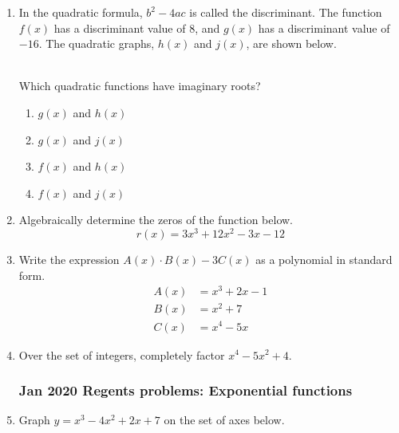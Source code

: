 \documentclass[12pt, twoside]{article}
\begin{document}
\begin{enumerate}[itemsep=0.5cm]
\item In the quadratic formula, $b^2-4ac$ is called the discriminant. The function $f(x)$ has a discriminant value of 8, and $g(x)$ has a discriminant value of $-16$. The quadratic graphs, $h(x)$ and $j(x)$, are shown below. \\
 \;
 \\
Which quadratic functions have imaginary roots?
\begin{enumerate}
    \item $g(x)$ and $h(x)$
    \item $g(x)$ and $j(x)$
    \item $f(x)$ and $h(x)$
    \item $f(x)$ and $j(x)$
\end{enumerate}

\item Algebraically determine the zeros of the function below. %
$$r(x) = 3x^3+12x^2-3x-12$$

\item Write the expression $A(x) \cdot B(x) - 3C(x)$ as a polynomial in standard form. %
    \begin{align*}
        A(x) &= x^3 + 2x - 1 \\
        B(x) &= x^2 + 7 \\
        C(x) &= x^4 - 5x
    \end{align*}

\item Over the set of integers, completely factor $x^4-5x^2+4$.

\newpage
\subsubsection*{Jan 2020 Regents problems: Exponential functions}

\item Graph $y = x^3 - 4x^2 + 2x + 7$ on the set of axes below.
    \begin{center}
    \end{center}

\end{enumerate}
\end{document}
